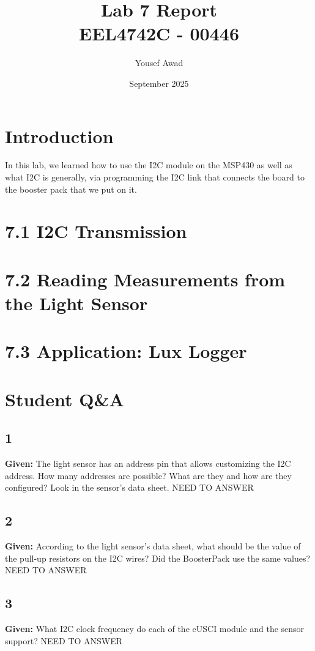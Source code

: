 \documentclass{article}
\title{Lab 7 Report \\ \large EEL4742C - 00446}
\author{Yousef Awad}
\date{September 2025}
\begin{document}
\maketitle
\tableofcontents
\newpage

\section{Introduction}
In this lab, we learned how to use the I2C module on the MSP430 as well as what I2C is generally, via programming the I2C link that connects the board to the booster pack that we put on it.

\section{7.1 I2C Transmission}

\pagebreak
\section{7.2 Reading Measurements from the Light Sensor}

\pagebreak
\section{7.3 Application: Lux Logger}

\pagebreak
\pagebreak
\section{Student Q\&A}
\subsection{1}
\textbf{Given:} The light sensor has an address pin that allows customizing the I2C address. How many addresses are possible? What are they and how are they configured? Look in the sensor’s data sheet.
\newline
\newline
NEED TO ANSWER

\subsection{2}
\textbf{Given:} According to the light sensor’s data sheet, what should be the value of the pull-up resistors on the I2C wires? Did the BoosterPack use the same values?
\newline
\newline
NEED TO ANSWER

\subsection{3}
\textbf{Given:} What I2C clock frequency do each of the eUSCI module and the sensor support?
\newline
\newline
NEED TO ANSWER
\end{document}
